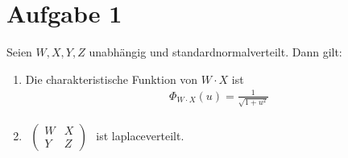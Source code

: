 \documentclass[12pt,a4paper]{article}
\author{Willi Sontopski}
\begin{document}
\section*{Aufgabe 1}
Seien $W,X,Y,Z$ unabhängig und standardnormalverteilt. Dann gilt:
\begin{enumerate}[label=\alph*)]
	\item Die charakteristische Funktion von $W\cdot X$ ist 
	\begin{align*}
		\Phi_{W\cdot X}(u)=\frac{1}{\sqrt{1+u^2}}
	\end{align*}
	\item $\begin{aligned}
		\begin{pmatrix}
			W & X\\
			Y & Z
		\end{pmatrix}
	\end{aligned}$ ist laplaceverteilt.
\end{enumerate}
\end{document}
